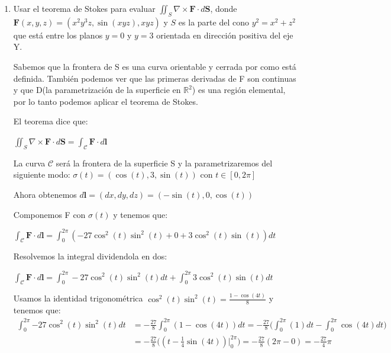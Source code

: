 \documentclass{article}
\begin{document}
\begin{enumerate}
{        }

        \pagebreak
        \item {
            Usar el teorema de Stokes para evaluar $\displaystyle\iint_{S} \nabla \times \mathbf{F} \cdot d\mathbf{S}$, donde $\mathbf{F}(x,y,z) =(x^2y^3z,\sin(xyz),xyz)$ y $S$ es la parte del cono $y^2 = x^2 + z^2$ que está entre los planos $y = 0$ y $y = 3$ orientada en dirección positiva del eje Y.

            \color{azul}
            Sabemos que la frontera de S es una curva orientable y cerrada por
            como está definida. También podemos ver que las primeras derivadas
            de F son continuas y que D(la parametrización de la superficie en
            $\mathbb{R}^2$) es una región elemental, por lo tanto podemos
            aplicar el teorema de Stokes.

            El teorema dice que:

            $\iint_{S} \nabla \times \mathbf{F} \cdot d\mathbf{S} = \int_{\mathcal{C}} \mathbf{F} \cdot d\mathbf{l}$

            La curva $\mathcal{C}$ será la frontera de la superficie S y la parametrizaremos del siguiente modo: $\sigma(t) = (\cos(t), 3, \sin(t))$ con $t \in [0, 2\pi]$

            Ahora obtenemos $d\mathbf{l} = (dx, dy, dz) = (-\sin(t), 0, \cos(t))$

        Componemos F con $\sigma(t)$ y tenemos que:

        $\int_{\mathcal{C}} \mathbf{F} \cdot d\mathbf{l} = \int_{0}^{2\pi} (-27\cos^2(t)\sin^2(t) + 0 + 3\cos^2(t)\sin(t)) dt$

        Resolvemos la integral dividendola en dos:

         $\int_{\mathcal{C}} \mathbf{F} \cdot d\mathbf{l} = \int_{0}^{2\pi} -27\cos^2(t)\sin^2(t) dt +   \int_{0}^{2\pi}3\cos^2(t)\sin(t)dt$

         Usamos la identidad trigonométrica $\cos^2(t)\sin^2(t) = \frac{1 - \cos(4t)}{8}$ y tenemos que:
         \begin{align*}
                \int_{0}^{2\pi}{-27\cos^2(t)\sin^2(t)dt}
                &= -\frac{27}{8} \int_{0}^{2\pi}{(1 - \cos(4t)) dt}
                = -\frac{27}{8} \Big(\int_{0}^{2\pi}{(1)dt }  - \int_{0}^{2\pi}{\cos(4t)dt}\Big)\\[0.3cm]
                &= -\frac{27}{8}\Big((t - \frac{1}{4} \sin(4t))\Big |_{0}^{2\pi}\Big)
                = -\frac{27}{8} (2\pi - 0)
               	= -\frac{27}{4}\pi
            \end{align*}

}
\end{enumerate}
\end{document}
